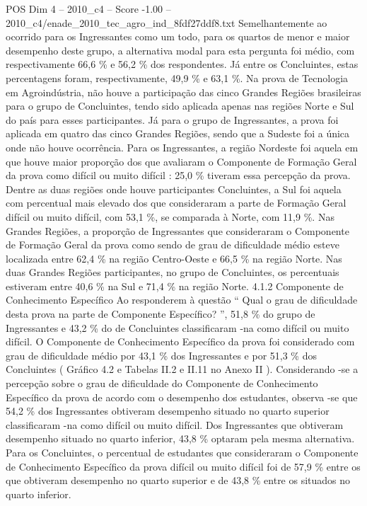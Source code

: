 \begin{textsample}{POS Dim 4 – 2010\_c4 – Score -1.00 – 2010\_c4/enade\_2010\_tec\_agro\_ind\_8fdf27ddf8.txt}
Semelhantemente ao ocorrido para os Ingressantes como um todo, para os quartos de menor e maior desempenho deste grupo, a alternativa modal para esta pergunta foi médio, com respectivamente 66,6 \% e 56,2 \% dos respondentes.
Já entre os Concluintes, estas percentagens foram, respectivamente, 49,9 \% e 63,1 \%.
Na prova de Tecnologia em Agroindústria, não houve a participação das cinco Grandes Regiões brasileiras para o grupo de Concluintes, tendo sido aplicada apenas nas regiões Norte e Sul do país para esses participantes.
Já para o grupo de Ingressantes, a prova foi aplicada em quatro das cinco Grandes Regiões, sendo que a Sudeste foi a única onde não houve ocorrência.
Para os Ingressantes, a região Nordeste foi aquela em que houve maior proporção dos que avaliaram o Componente de Formação Geral da prova como difícil ou muito difícil : 25,0 \% tiveram essa percepção da prova.
Dentre as duas regiões onde houve participantes Concluintes, a Sul foi aquela com percentual mais elevado dos que consideraram a parte de Formação Geral difícil ou muito difícil, com 53,1 \%, se comparada à Norte, com 11,9 \%.
Nas Grandes Regiões, a proporção de Ingressantes que consideraram o Componente de Formação Geral da prova como sendo de grau de dificuldade médio esteve localizada entre 62,4 \% na região Centro-Oeste e 66,5 \% na região Norte.
Nas duas Grandes Regiões participantes, no grupo de Concluintes, os percentuais estiveram entre 40,6 \% na Sul e 71,4 \% na região Norte. 4.1.2 Componente de Conhecimento Específico Ao responderem à questão “ Qual o grau de dificuldade desta prova na parte de Componente Específico? ”, 51,8 \% do grupo de Ingressantes e 43,2 \% do de Concluintes classificaram -na como difícil ou muito difícil.
O Componente de Conhecimento Específico da prova foi considerado com grau de dificuldade médio por 43,1 \% dos Ingressantes e por 51,3 \% dos Concluintes ( Gráfico 4.2 e Tabelas II.2 e II.11 no Anexo II ).
Considerando -se a percepção sobre o grau de dificuldade do Componente de Conhecimento Específico da prova de acordo com o desempenho dos estudantes, observa -se que 54,2 \% dos Ingressantes obtiveram desempenho situado no quarto superior classificaram -na como difícil ou muito difícil.
Dos Ingressantes que obtiveram desempenho situado no quarto inferior, 43,8 \% optaram pela mesma alternativa.
Para os Concluintes, o percentual de estudantes que consideraram o Componente de Conhecimento Específico da prova difícil ou muito difícil foi de 57,9 \% entre os que obtiveram desempenho no quarto superior e de 43,8 \% entre os situados no quarto inferior.

\end{textsample}
